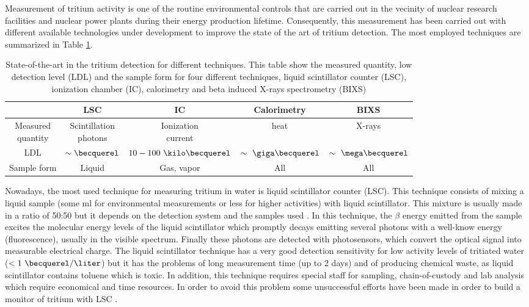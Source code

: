 Measurement of tritium activity is one of the routine environmental controls that are carried out in the vecinity of nuclear research facilities and nuclear power plants during their energy production lifetime. Consequently, this measurement has been carried out with different available technologies under development to improve the state of the art of tritium detection. The most employed techniques are summarized in Table \ref{tab:DifferentThecnics}.

\begin{table}[htbp]
\begin{center}
\begin{tabular}{|c|c|c|c|c|}
\hline
 & LSC & IC & Calorimetry & BIXS\\
\hline \hline \hline
\parbox{5em}{\centering Measured\\ quantity} & \parbox{5em}{\centering Scintillation\\ photons} &  \parbox{5em}{\centering Ionization\\ current} & heat & X-rays\\ \hline
LDL & $\sim\becquerel$ & $10-100~\kilo\becquerel$ & $\sim~\giga\becquerel$ & $\sim~\mega\becquerel$ \\ \hline
Sample form & Liquid & Gas, vapor & All & All \\ \hline
\end{tabular}
\caption{State-of-the-art in the tritium detection for different techniques. This table show the measured quantity, low detection level (LDL) and the sample form for four different techniques, liquid scintillator counter (LSC), ionization chamber (IC), calorimetry and beta induced X-rays spectrometry (BIXS)}
\label{tab:DifferentThecnics}
\end{center}
\end{table}

Nowadays, the most used technique for measuring tritium in water is liquid scintillator counter (LSC). This technique consists of mixing a liquid sample (some ml for environmental measurements or less for higher activities) with liquid scintillator. This mixture is usually made in a ratio of 50:50 but it depends on the detection system and the samples used \cite{LSCothers, HofstetterSeveral}. In this technique, the $\beta$ energy emitted from the sample excites the molecular energy levels of the liquid scintillator which promptly decays emitting several photons with a well-know energy (fluorescence), usually in the visible spectrum. Finally these photons are detected with photosensors, which convert the optical signal into measurable electrical charge. The liquid scintillator technique has a very good detection sensitivity for low activity levels of tritiated water ($<1~\becquerel/\liter$) \cite{0.6Bq_L} but it has the problems of long measurement time (up to 2 days) and of producing chemical waste, as liquid scintillator contains toluene which is toxic. In addition, this technique requires special staff for sampling, chain-of-custody and lab analysis which require economical and time resources. In order to avoid this problem some unsuccessful efforts have been made in order to build a monitor of tritium with LSC \cite{OnlineLSC}. 

